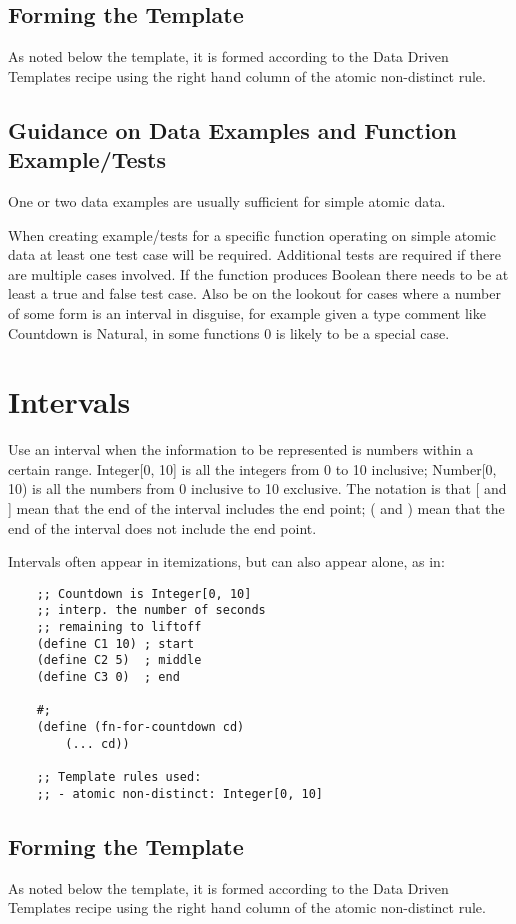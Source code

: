 \documentclass[11pt,a4paper]{report}
\begin{document}
	\subsection*{Forming the Template}
	As noted below the template, it is formed according to the Data Driven Templates recipe using the
	right hand column of the atomic non-distinct rule.
	
	\subsection*{Guidance on Data Examples and Function Example/Tests}
	One or two data examples are usually sufficient for simple atomic data.
	
	When creating example/tests for a specific function operating on simple atomic data at least one
	test case will be required. Additional tests are required if there are multiple cases involved. If the
	function produces Boolean there needs to be at least a true and false test case. Also be on the
	lookout for cases where a number of some form is an interval in disguise, for example given a type
	comment like Countdown is Natural, in some functions 0 is likely to be a special case.
	\pagebreak
	\section{Intervals} \label{sec:interval}
	Use an interval when the information to be represented is numbers within a certain range.
	Integer[0, 10] is all the integers from 0 to 10 inclusive; Number[0, 10) is all the numbers
	from 0 inclusive to 10 exclusive. The notation is that [ and ] mean that the end of the interval
	includes the end point; ( and ) mean that the end of the interval does not include the end point.
	
	Intervals often appear in itemizations, but can also appear alone, as in:
	
	\begin{verbatim}
	;; Countdown is Integer[0, 10]
	;; interp. the number of seconds
	;; remaining to liftoff
	(define C1 10) ; start
	(define C2 5)  ; middle
	(define C3 0)  ; end
	
	#;
	(define (fn-for-countdown cd)
		(... cd))
		
	;; Template rules used:
	;; - atomic non-distinct: Integer[0, 10]
	\end{verbatim}
	
	\subsection*{Forming the Template}
	As noted below the template, it is formed according to the Data Driven Templates recipe using the
	right hand column of the atomic non-distinct rule.
	
\end{document}
